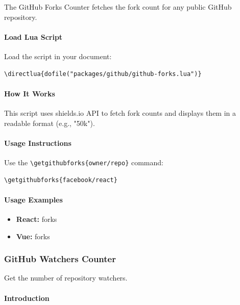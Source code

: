 \documentclass{article}
\begin{document}
The GitHub Forks Counter fetches the fork count for any public GitHub repository.

\paragraph{Load Lua Script}

Load the script in your document:

\begin{verbatim}
\directlua{dofile("packages/github/github-forks.lua")}
\end{verbatim}

\paragraph{How It Works}

This script uses shields.io API to fetch fork counts and displays them in a readable format (e.g., "50k").

\paragraph{Usage Instructions}

Use the \verb|\getgithubforks{owner/repo}| command:

\begin{verbatim}
\getgithubforks{facebook/react}
\end{verbatim}

\paragraph{Usage Examples}

\begin{itemize}
    \item \textbf{React:}  forks
    \item \textbf{Vue:}  forks
\end{itemize}

\subsubsection{GitHub Watchers Counter}

Get the number of repository watchers.

\paragraph{Introduction}
\end{document}
